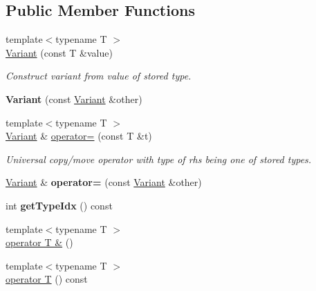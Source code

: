 \subsection*{Public Member Functions}
\begin{DoxyCompactItemize}
\item 
\hypertarget{classVariant_af496296e133494fb7434275d75b59f9a}{}\label{classVariant_af496296e133494fb7434275d75b59f9a} 
{\footnotesize template$<$typename T $>$ }\\\hyperlink{classVariant_af496296e133494fb7434275d75b59f9a}{Variant} (const T \&value)
\begin{DoxyCompactList}\small\item\em Construct variant from value of stored type. \end{DoxyCompactList}\item 
\hypertarget{classVariant_ad4f43d3af193f9380ab5acf332d0213c}{}\label{classVariant_ad4f43d3af193f9380ab5acf332d0213c} 
{\bfseries Variant} (const \hyperlink{classVariant}{Variant} \&other)
\item 
\hypertarget{classVariant_a9b4058e961015761760424eb4b9bbde0}{}\label{classVariant_a9b4058e961015761760424eb4b9bbde0} 
{\footnotesize template$<$typename T $>$ }\\\hyperlink{classVariant}{Variant} \& \hyperlink{classVariant_a9b4058e961015761760424eb4b9bbde0}{operator=} (const T \&t)
\begin{DoxyCompactList}\small\item\em Universal copy/move operator with type of rhs being one of stored types. \end{DoxyCompactList}\item 
\hypertarget{classVariant_aadde489dd5d2d63a8450f9e6bd67336d}{}\label{classVariant_aadde489dd5d2d63a8450f9e6bd67336d} 
\hyperlink{classVariant}{Variant} \& {\bfseries operator=} (const \hyperlink{classVariant}{Variant} \&other)
\item 
\hypertarget{classVariant_af27bc8ab79fc633e811904f58eba9cf3}{}\label{classVariant_af27bc8ab79fc633e811904f58eba9cf3} 
int {\bfseries get\+Type\+Idx} () const
\item 
{\footnotesize template$<$typename T $>$ }\\\hyperlink{classVariant_a4a9d805a2f8a07ee673d8db8a9f7a524}{operator T \&} ()
\item 
\hypertarget{classVariant_a939142e02efadd71477177b6c4c67b57}{}\label{classVariant_a939142e02efadd71477177b6c4c67b57} 
{\footnotesize template$<$typename T $>$ }\\\hyperlink{classVariant_a939142e02efadd71477177b6c4c67b57}{operator T} () const

\end{DoxyCompactItemize}
